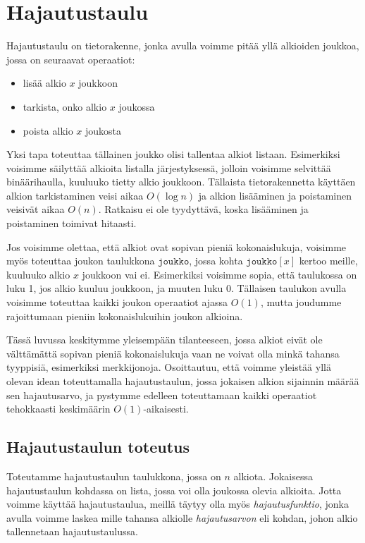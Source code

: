 \chapter{Hajautustaulu}

Hajautustaulu on tietorakenne,
jonka avulla voimme pitää yllä alkioiden joukkoa,
jossa on seuraavat operaatiot:

\begin{itemize}
\item lisää alkio $x$ joukkoon
\item tarkista, onko alkio $x$ joukossa
\item poista alkio $x$ joukosta
\end{itemize}

Yksi tapa toteuttaa tällainen joukko olisi tallentaa
alkiot listaan.
Esimerkiksi voisimme säilyttää alkioita listalla
järjestyksessä, jolloin voisimme selvittää binäärihaulla,
kuuluuko tietty alkio joukkoon.
Tällaista tietorakennetta käyttäen alkion tarkistaminen
veisi aikaa $O(\log n)$ ja alkion lisääminen ja poistaminen
veisivät aikaa $O(n)$.
Ratkaisu ei ole tyydyttävä, koska lisääminen ja poistaminen
toimivat hitaasti.

Jos voisimme olettaa, että alkiot ovat sopivan pieniä kokonaislukuja,
voisimme myös toteuttaa joukon taulukkona $\texttt{joukko}$,
jossa kohta $\texttt{joukko}[x]$ kertoo meille,
kuuluuko alkio $x$ joukkoon vai ei.
Esimerkiksi voisimme sopia, että taulukossa on luku 1,
jos alkio kuuluu joukkoon, ja muuten luku 0.
Tällaisen taulukon avulla voisimme toteuttaa kaikki
joukon operaatiot ajassa $O(1)$, mutta joudumme rajoittumaan
pieniin kokonaislukuihin joukon alkioina.

Tässä luvussa keskitymme yleisempään tilanteeseen,
jossa alkiot eivät ole välttämättä sopivan pieniä kokonaislukuja
vaan ne voivat olla minkä tahansa tyyppisiä, esimerkiksi merkkijonoja.
Osoittautuu, että voimme yleistää yllä olevan idean toteuttamalla
hajautustaulun, jossa jokaisen alkion sijainnin määrää sen hajautusarvo,
ja pystymme edelleen toteuttamaan kaikki operaatiot
tehokkaasti keskimäärin $O(1)$-aikaisesti.

\section{Hajautustaulun toteutus}

Toteutamme hajautustaulun taulukkona,
jossa on $n$ alkiota.
Jokaisessa hajautustaulun kohdassa on lista,
jossa voi olla joukossa olevia alkioita.
Jotta voimme käyttää hajautustaulua,
meillä täytyy olla myös \emph{hajautusfunktio},
jonka avulla voimme laskea mille tahansa alkiolle
\emph{hajautusarvon} eli kohdan, johon alkio
tallennetaan hajautustaulussa.

